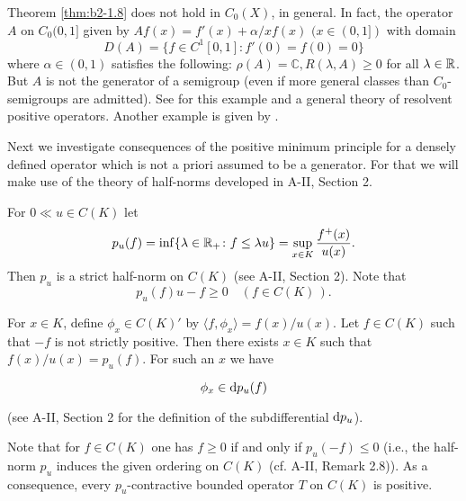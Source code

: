 \begin{remark*}\label{rem:b2-1.9-kgk2}
Theorem \ref{thm:b2-1.8} does not hold in $C_{0}(X)$, in general.
In fact, the operator $A$ on $C_{0}(0,1]$ given by $Af(x) = f'(x) + \alpha/x f(x)$ $(x \in (0,1])$ with domain 
\[
D(A) = \{f \in C^{1}[0,1] \colon f'(0) = f(0) = 0\} 
\]
where $\alpha \in (0,1)$  satisfies the following: 
$\rho(A) = \mathbb{C}, R(\lambda,A) \geq 0$ for all $\lambda \in \mathbb{R}$.
But $A$ is not the generator of a semigroup (even if more general classes than $C_{0}$-semigroups are admitted).
See \citet{arendt:1987} 
for this example and a general theory of resolvent positive operators.
Another example is given by \citet{battydavies:1983}.
\end{remark*}

Next we investigate consequences of the positive minimum principle for a densely defined operator which is not a priori assumed to be a generator.
For that we will make use of the theory of half-norms developed in A-II, Section 2.

For $0  \ll u \in C(K)$ let
\begin{equation}\label{eq:b2-1.4}
p_{u}(f) = \inf\{\lambda \in \mathbb{R}_{+} \colon f \leq \lambda u\} = \sup_{x \in K} \frac{f^{+}(x)}{u(x)}.
\end{equation}
Then $p_{u}$ is a strict half-norm on $C(K)$ (see A-II, Section  2).
Note that
\begin{equation}\label{eq:b2-1.5}
p_{u}(f)u - f \geq 0 \quad (f \in C(K)\,).
\end{equation}

For $x \in K$, define $\phi_{x} \in C(K)'$ by $\langle f,\phi_{x} \rangle = f(x)/u(x)$.
Let $f \in C(K)$ such that $-f$ is not strictly positive.
Then there exists $x \in K$ such that $f(x)/u(x) = p_{u}(f)$.
For such an $x$ we have

\begin{equation}\label{eq:b2-1.6}
\phi_{x} \in \mathop{}\!\mathrm{d}{p}_{u}(f)
\end{equation}


(see A-II, Section 2 for the definition of the subdifferential $\mathop{}\!\mathrm{d}{p}_{u}$).

Note that for $f \in C(K)$ one has $f \geq 0$ if and only if $p_{u}(-f) \leq 0$ (i.e., the half-norm $p_{u}$ induces the given ordering on $C(K)$ (cf. A-II, Remark 2.8)).
As a consequence, every $p_{u}$-contractive bounded operator $T$ on $C(K)$ is positive.


